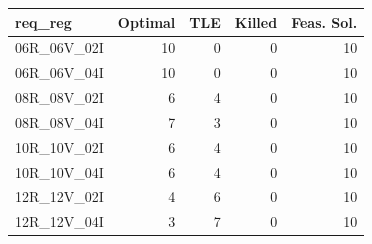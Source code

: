 
\begin{tabular}{lrrrr}
\toprule
req\_reg & Optimal & TLE & Killed & Feas. Sol.\\
\midrule
06R\_06V\_02I & 10 & 0 & 0 & 10\\
06R\_06V\_04I & 10 & 0 & 0 & 10\\
08R\_08V\_02I & 6 & 4 & 0 & 10\\
08R\_08V\_04I & 7 & 3 & 0 & 10\\
10R\_10V\_02I & 6 & 4 & 0 & 10\\
\addlinespace
10R\_10V\_04I & 6 & 4 & 0 & 10\\
12R\_12V\_02I & 4 & 6 & 0 & 10\\
12R\_12V\_04I & 3 & 7 & 0 & 10\\
\bottomrule
\end{tabular}
